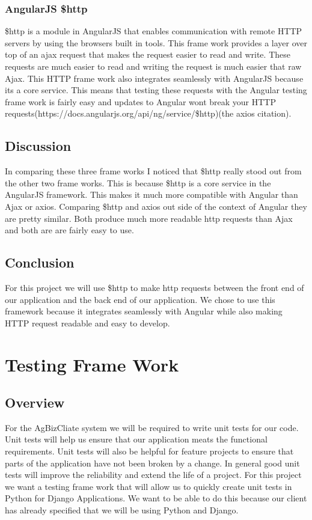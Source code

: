 \documentclass[letterpaper,10pt]{article}
\begin{document}
		\subsubsection{AngularJS \$http}
		\$http is a module in AngularJS that enables communication with remote HTTP servers by using the browsers built in tools. This frame work provides a layer over top of an ajax request that makes the request easier to read and write. These requests are much easier to read and writing the request is much easier that raw Ajax. This HTTP frame work also integrates seamlessly with AngularJS because its a core service. This means that testing these requests with the Angular testing frame work is fairly easy and updates to Angular wont break your HTTP requests(https://docs.angularjs.org/api/ng/service/\$http)(the axios citation).
	\subsection{Discussion}
		In comparing these three frame works I noticed that \$http really stood out from the other two frame works. This is because \$http is a core service in the AngularJS framework. This makes it much more compatible with Angular than Ajax or axios. Comparing \$http and axios out side of the context of Angular they are pretty similar. Both produce much more readable http requests than Ajax and both are are fairly easy to use.
	\subsection{Conclusion}
	For this project we will use \$http to make http requests between the front end of our application and the back end of our application. We chose to use this framework because it integrates seamlessly with Angular while also making HTTP request readable and easy to develop.
	
\section{Testing Frame Work}
	\subsection{Overview}
						For the AgBizCliate system we will be required to write unit tests for our code. Unit tests will help us ensure that our application meats the functional requirements. Unit tests will also be helpful for feature projects to ensure that parts of the application have not been broken by a change. In general good unit tests will improve the reliability and extend the life of a project. For this project we want a testing frame work that will allow us to quickly create unit tests in Python for Django Applications. We want to be able to do this because our client has already specified that we will be using Python and Django.\\
\end{document}
